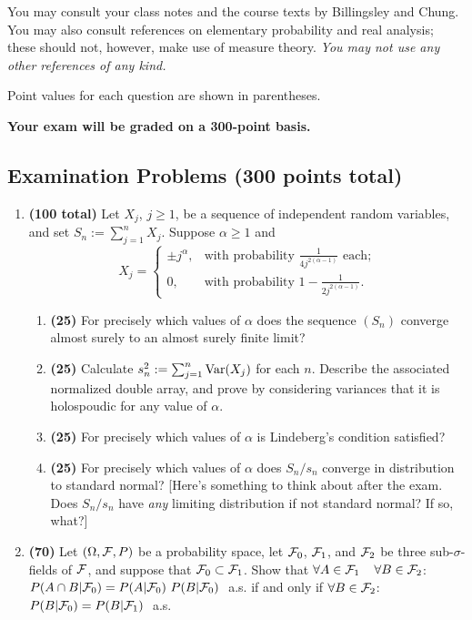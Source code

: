 You may consult your class notes and the course texts by
Billingsley and Chung.  You may also consult references on elementary
probability and real analysis; these should not, however, make use of
measure theory.  {\em You may not use any other references of any kind.\/}

Point values for each question are shown in parentheses.

{\bf Your exam will be graded on a 300-point basis.}

\subsection*{Examination Problems (300 points total)}

\begin{enumerate}

\item {\bf (100 total)} Let $X_j$, $j \geq 1$, be a sequence of independent
random variables, and set $S_n := \sum_{j=1}^n X_j$.  Suppose $\alpha \geq 1$
and 
$$
X_j = \left\{ \begin{array}{ll}
               \pm j^{\alpha}, & \mbox{with probability\ }\frac{1}{4
                                  j^{2(\alpha - 1)}} \mbox{\ each;} \\
               0,              & \mbox{with probability\ }1 - \frac{1}{2
                                  j^{2(\alpha - 1)}}.
              \end{array}
      \right.
$$  
 \begin{enumerate}
\item {\bf (25)} For precisely which values of $\alpha$ does the sequence
$(S_n)$ converge almost surely to an almost surely finite limit? 
\item {\bf (25)} Calculate $s_n^2 := \sum_{j=1}^n {\rm Var}(X_j)$ for each $n$.
Describe the associated normalized double
array, and prove by considering variances that it is holospoudic for
any value of $\alpha$.
\item {\bf (25)} For precisely which values of $\alpha$ is Lindeberg's condition
satisfied?
\item {\bf (25)} For precisely which values of $\alpha$ does $S_n/s_n$ converge
in distribution to standard normal?  [Here's something to think about after the
exam.  Does $S_n/s_n$ have {\em any\/} limiting distribution if not standard
normal?  If so, what?]
 \end{enumerate}

\item {\bf (70)} Let $(\Omega,{\cal F},P)$ be a probability space, let ${\cal F}_0$,
${\cal F}_1$, and ${\cal F}_2$ be three sub-$\sigma$-fields of ${\cal F}$, and suppose that
${\cal F}_0 \subset {\cal F}_1$.  Show that
\bege
\mbox{$\forall A \in \Fc_1$\ \ $\forall B \in \Fc_2$:\ \ $P(A \cap B|\Fc_0) =
P(A|\Fc_0)\ P(B|\Fc_0)$\,\ a.s.}
\ene
if and only if
\bege
\mbox{$\forall B \in \Fc_2$:\ \ $P(B|\Fc_0) = P(B|\Fc_1)$\,\ a.s.} 
\ene


\end{enumerate}
